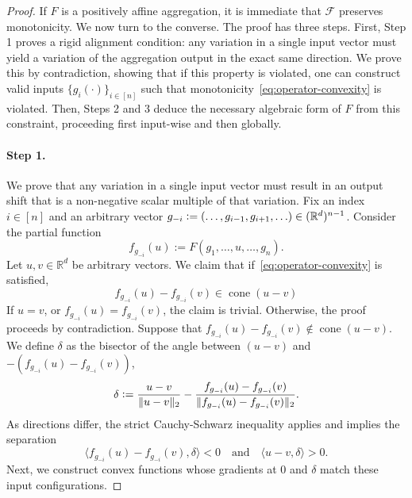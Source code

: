 \documentclass[twoside,11pt]{article}
\newcommand{\R}{\mathbb{R}}
\newcommand{\F}{\mathcal{F}}
\begin{document}
\begin{proof}
    If $F$ is a positively affine aggregation, it is immediate that $\F$ preserves monotonicity.
    We now turn to the converse. 
    The proof has three steps.
    First, Step 1 proves a rigid alignment condition: any variation in a single input vector must yield a variation of the aggregation output in the exact same direction.
    We prove this by contradiction, showing that if this property is violated, one can construct valid inputs $\{g_i(\cdot)\}_{i\in[n]}$ such that monotonicity~\eqref{eq:operator-convexity} is violated.
    Then, Steps 2 and 3 deduce the necessary algebraic form of $F$ from this constraint, proceeding first input-wise and then globally.

    \paragraph{Step 1.} We prove that any variation in a single input vector must result in an output shift that is a non-negative scalar multiple of that variation. 
    Fix an index $i \in [n]$ and an arbitrary vector $g_{-i} \vcentcolon= (\ldots, g_{i-1}, g_{i+1}, \ldots) \in (\R^d)^{n-1}$. 
    Consider the partial function
    \[
        f_{g_{-i}}(u) := F(g_1, \ldots, u, \ldots, g_n).
    \]
    Let $u, v \in \mathbb{R}^d$ be arbitrary vectors. 
    We claim that if~\eqref{eq:operator-convexity} is satisfied,
    \[
        f_{g_{-i}}(u) - f_{g_{-i}}(v) \in \operatorname{cone}(u-v) %
    \] 
    If $u = v$, or $f_{g_{-i}}(u) = f_{g_{-i}}(v)$, the claim is trivial. 
    Otherwise, the proof proceeds by contradiction. Suppose that $f_{g_{-i}}(u) - f_{g_{-i}}(v) \notin \operatorname{cone}(u-v)$.
    We define $\delta$ as the bisector of the angle between $(u-v)$ and $-(f_{g_{-i}}(u) - f_{g_{-i}}(v))$,
    \[
        \delta \vcentcolon= \frac{u-v}{\|u-v\|_2} - \frac{f_{g_{-i}}(u) - f_{g_{-i}}(v)}{\|f_{g_{-i}}(u) - f_{g_{-i}}(v)\|_2}.
    \]
    As directions differ, the strict Cauchy-Schwarz inequality applies and implies the separation 
    \begin{equation}\label{eq:strict_separation}
        \langle f_{g_{-i}}(u) - f_{g_{-i}}(v), \delta \rangle < 0 \quad \text{and} \quad \langle u-v, \delta \rangle > 0.
    \end{equation}
    Next, we construct convex functions whose gradients at $0$ and $\delta$ match these input configurations.

\end{proof}
\end{document}
